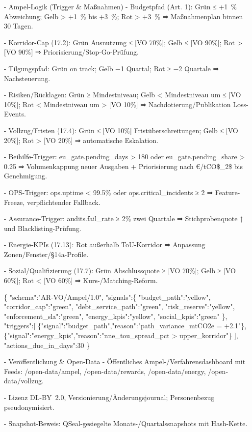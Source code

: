 \documentclass[12pt,a4paper]{scrartcl}
\begin{document}
- Ampel-Logik (Trigger \& Maßnahmen)
- Budgetpfad (Art. 1): Grün ≤ +1 \% Abweichung; Gelb > +1 \% bis +3 \%; Rot > +3 \% ⇒ Maßnahmenplan binnen 30 Tagen.

- Korridor-Cap (17.2): Grün Ausnutzung ≤ [VO 70\%]; Gelb ≤ [VO 90\%]; Rot > [VO 90\%] ⇒ Priorisierung/Stop-Go-Prüfung.

- Tilgungspfad: Grün on track; Gelb −1 Quartal; Rot ≥ −2 Quartale ⇒ Nachsteuerung.

- Risiken/Rücklagen: Grün ≥ Mindestniveau; Gelb < Mindestniveau um ≤ [VO 10\%]; Rot < Mindestniveau um > [VO 10\%] ⇒ Nachdotierung/Publikation Loss-Events.

- Vollzug/Fristen (17.4): Grün ≤ [VO 10\%] Fristüberschreitungen; Gelb ≤ [VO 20\%]; Rot > [VO 20\%] ⇒ automatische Eskalation.

- Beihilfe-Trigger: eu\_gate.pending\_days > 180 oder eu\_gate.pending\_share > 0.25 ⇒ Volumenkappung neuer Ausgaben + Priorisierung nach €/tCO\$\_2\$ bis Genehmigung.

- OPS-Trigger: ops.uptime < 99.5\% oder ops.critical\_incidents ≥ 2 ⇒ Feature-Freeze, verpflichtender Fallback.

- Assurance-Trigger: audits.fail\_rate ≥ 2\% zwei Quartale ⇒ Stichprobenquote ↑ und Blacklisting-Prüfung.

- Energie-KPIs (17.13): Rot außerhalb ToU-Korridor ⇒ Anpassung Zonen/Fenster/§14a-Profile.

- Sozial/Qualifizierung (17.7): Grün Abschlussquote ≥ [VO 70\%]; Gelb ≥ [VO 60\%]; Rot < [VO 60\%] ⇒ Kurs-/Matching-Reform.

\{
  "schema":"AR-VO/Ampel/1.0",
  "signals":\{
    "budget\_path":"yellow",
    "corridor\_cap":"green",
    "debt\_service\_path":"green",
    "risk\_reserve":"yellow",
    "enforcement\_sla":"green",
    "energy\_kpis":"yellow",
    "social\_kpis":"green"
  \},
  "triggers":[
    \{"signal":"budget\_path","reason":"path\_variance\_mtCO2e = +2.1"\},
    \{"signal":"energy\_kpis","reason":"nne\_tou\_spread\_pct > upper\_korridor"\}
  ],
  "actions\_due\_in\_days":30
\}

- Veröffentlichung \& Open-Data
- Öffentliches Ampel-/Verfahrensdashboard mit Feeds: /open-data/ampel, /open-data/rewards, /open-data/energy, /open-data/vollzug.

- Lizenz DL-BY 2.0, Versionierung/Änderungsjournal; Personenbezug pseudonymisiert.

- Snapshot-Beweis: QSeal-gesiegelte Monats-/Quartalssnapshots mit Hash-Kette.
\end{document}
